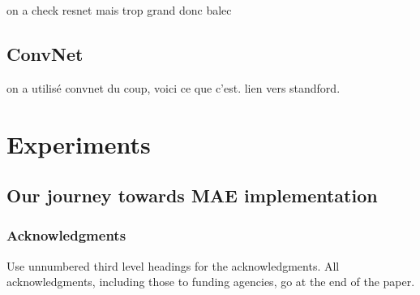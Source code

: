 \documentclass{article} %
\begin{document}
on a check resnet mais trop grand donc balec

\subsection {ConvNet}
on a utilisé convnet du coup, voici ce que c'est. lien vers standford.

\section{Experiments}
\subsection{Our journey towards MAE implementation}


\subsubsection*{Acknowledgments}

Use unnumbered third level headings for the acknowledgments. All
acknowledgments, including those to funding agencies, go at the end of the paper.



\end{document}
